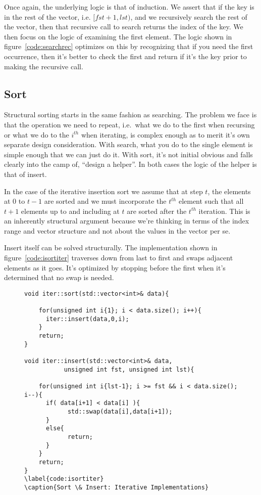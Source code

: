 \documentclass[nobib]{tufte-handout}
\begin{document}
Once again, the underlying logic is that of induction. We assert that if the key is in the rest  of the vector, i.e. $[fst+1,lst)$, and we recursively search the rest of the vector, then that recursive call to search returns the index of the key. We then focus on the logic of examining the first element. The logic shown in figure~\ref{code:searchrec} optimizes on this by recognizing that if you need the first occurrence, then it's better to check the first and return if it's the key prior to making the recursive call. %

\subsection{Sort}

Structural sorting starts in the same fashion as searching. The problem we face is that the operation we need to repeat, i.e.\ what we do to the first when recursing or what we do to the $i^{th}$ when iterating, is complex enough as to merit it's own separate design consideration. With search, what you do to the single element is simple enough that we can just do it. With sort, it's not initial obvious and falls clearly into the camp of, ``design a helper''. In both cases the logic of the helper is that of insert.

In the case of the iterative insertion sort we assume that at step $t$, the elements at $0$ to $t-1$ are sorted and we must incorporate the $t^{th}$ element such that all $t+1$ elements up to and including at $t$ are sorted after the $t^{th}$ iteration. This is an inherently structural argument because we're thinking in terms of the index range and vector structure and not about the values in the vector per se.

Insert itself can be solved structurally. The implementation shown in figure~\ref{code:isortiter} traverses down from last to first and swaps adjacent elements as it goes. It's optimized by stopping before the first when it's determined that no swap is needed.

\begin{figure}
\begin{lstlisting}
void iter::sort(std::vector<int>& data){

    for(unsigned int i{1}; i < data.size(); i++){
      iter::insert(data,0,i);
    }
    return;
}

void iter::insert(std::vector<int>& data,
		   unsigned int fst, unsigned int lst){

    for(unsigned int i{lst-1}; i >= fst && i < data.size(); i--){
      if( data[i+1] < data[i] ){
		    std::swap(data[i],data[i+1]);
      }
      else{
		    return;
      }
    }
    return;
}
\label{code:isortiter}
\caption{Sort \& Insert: Iterative Implementations}
\end{lstlisting}
\end{figure}
\end{document}
